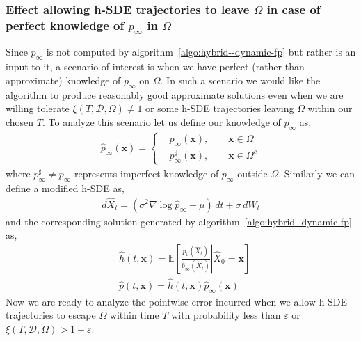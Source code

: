 \subsubsection{Effect allowing h-SDE trajectories to leave \texorpdfstring{$\Omega$}{Lg} in case of perfect knowledge of \texorpdfstring{$p_\infty$ in $\Omega$}{Lg}}\label{sssec-error--dynamic-fp}
 Since $p_\infty$ is not computed by algorithm~\ref{algo:hybrid--dynamic-fp} but rather is an input to it, a scenario of interest is when we have perfect (rather than approximate) knowledge of $p_\infty$ on $\Omega$. In such a scenario we would like the algorithm to produce reasonably good approximate solutions even when we are willing tolerate $\xi(T, \mathcal D, \Omega)\neq1$ or some h-SDE trajectories leaving $\Omega$ within our chosen $T$. To analyze this scenario let us define our knowledge of $p_\infty$ as,
 \begin{align}
     \hat p_\infty(\mathbf x) =\begin{cases}
         &p_\infty(\mathbf x), \qquad\mathbf x\in\Omega\\
         &p_\infty^\sharp(\mathbf x),\qquad\mathbf x\in\Omega^c
     \end{cases} 
 \end{align}
 where $p_\infty^\sharp\neq p_\infty$ represents imperfect knowledge of $p_\infty$ outside $\Omega$. Similarly we can define a modified h-SDE as,
 \begin{align}
     d\hat X_t = (\sigma^2\nabla\log \hat p_\infty -\mu)\,dt+\sigma\,dW_t
 \end{align} 
 and the corresponding solution generated by algorithm~\ref{algo:hybrid--dynamic-fp} as,
 \begin{align}
   &\hat h(t, \mathbf x) = \mathbb E\left[\left.\frac{p_0(\hat{X}_t)}{\hat{p}_\infty(\hat{X}_t)}\right\vert \hat{X}_0=\mathbf x\right]\\
   & \hat p(t ,\mathbf x)=\hat h(t, \mathbf x) \hat p_\infty(\mathbf x)
\end{align}
Now we are ready to analyze the pointwise error incurred when we allow h-SDE trajectories to escape $\Omega$ within time $T$ with probability less than $\varepsilon$ or $\xi(T, \mathcal D, \Omega)>1-\varepsilon$.
